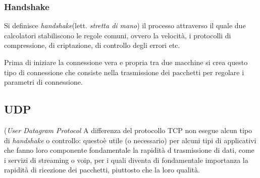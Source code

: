     \subsubsection{Handshake}
    Si definisce \textit{handshake}(lett. \textit{stretta di mano}) il processo attraverso il quale due calcolatori stabiliscono le regole comuni, ovvero la velocità, i protocolli di compressione, di criptazione, di controllo degli errori etc.
    
    Prima di iniziare la connessione vera e propria tra due macchine si crea questo tipo di connessione che consiste nella trasmissione dei pacchetti per regolare i parametri di connessione.

\subsection{UDP} (\textit{User Datagram Protocol}
A differenza del protocollo TCP non esegue alcun tipo di \textit{handshake} o controllo: questoè utile (o necessario) per alcuni tipi di applicativi che fanno loro componente fondamentale la rapidità d trasmissione di dati, come i servizi di streaming o voip, per i quali diventa di fondamentale importanza la rapidità di ricezione dei pacchetti, piuttosto che la loro qualità.

